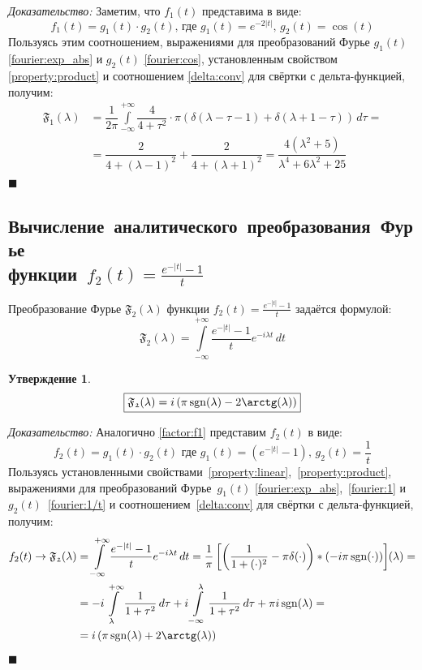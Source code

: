 \documentclass[11pt, oneside, draft]{article}
\numberwithin{equation}{section}
\newtheorem*{statement}{Утверждение}
\renewenvironment{proof}{\noindent\textit{Доказательство: }} {\qed}
\newcommand \rarrow{\rightarrow}
\newcommand \intinf[1][{\,dt}]{ \int\limits_{-\infty}^{+\infty}{{#1}}}
\renewcommand \qed{$\blacksquare$}
\DeclareMathOperator{\sgn}{sgn}
\begin{document}
	\begin{proof}
	Заметим, что \(f_1(t) \) представима в виде: 
	\begin{equation}\label{factor:f1}
	f_1(t) = g_1(t) \cdot g_2(t) \text{, где }g_1(t) = e^{-2|t|},\,g_2(t) = \cos(t)
	\end{equation}
	Пользуясь этим соотношением, выражениями для преобразований Фурье \(g_1(t)\) \eqref{fourier:exp_abs} и \(g_2(t)\) \eqref{fourier:cos}, установленным свойством \ref{property:product}
	 и соотношением \eqref{delta:conv} для свёртки с дельта-функцией, получим: 
	 \[
	 \begin{split}
		 \mathfrak{F_1} (\lambda) &= \dfrac{1}{2\pi} \intinf[{\dfrac{4}{4 + \tau^2} \cdot \pi(\delta(\lambda - \tau- 1) + \delta(\lambda + 1 - \tau))\,d\tau}] = \\
		 &=\dfrac{2}{4 + (\lambda - 1)^2} + \dfrac{2}{4 + (\lambda + 1)^2} 
		= \dfrac{4(\lambda^2 + 5)}{\lambda^4 + 6\lambda^2 + 25}
	\end{split}
	\]
	\end{proof}
	
\subsection{Вычисление~аналитического~преобразования~Фурье\\функции~\(f_2(t) = \frac{e^{-|t|} - 1}{t} \)}
Преобразование Фурье \( \mathfrak{F_2} (\lambda)\) функции \(f_2(t) = \frac{e^{-|t|} - 1}{t} \) задаётся формулой:
	\[
		\mathfrak{F_2} (\lambda) = \intinf[{\dfrac{e^{-|t|} - 1}{t} e^{-i\lambda t}\, dt}]
	\]

	\begin{statement}
	\begin{equation}\label{fourier_transform:f2}
	\boxed{
		\mathfrak{F_2}(\lambda) =  i\left(\pi\sgn(\lambda) - 2\arctg(\lambda)\right)
	}
	\end{equation}
	\end{statement}
	\begin{proof}
	Аналогично \eqref{factor:f1} представим \(f_2(t) \) в виде: 
	\begin{equation}\label{factor:f2}
	f_2(t) = g_1(t) \cdot g_2(t) \text{ где } g_1(t) = \left(e^{-|t|} - 1\right)\text{, }g_2(t) = \dfrac{1}{t}
	\end{equation}
	Пользуясь установленными свойствами~\ref{property:linear},~\ref{property:product}, выражениями для преобразований Фурье~\(g_1(t)\) \eqref{fourier:exp_abs},~\eqref{fourier:1} и~\(g_2(t)\)~\eqref{fourier:1/t}
	и соотношением~\eqref{delta:conv} для свёртки с дельта-функцией, получим: 
	\[
	\begin{split}
		f_2(t) \rarrow \mathfrak{F_2} (\lambda) &= \intinf[{ \dfrac{e^{-|t|} - 1}{t} e^{-i\lambda t}\, dt}] = \dfrac{1}{\pi}\left[\left({\dfrac{1}{1 + (\cdot)^2} - \pi\delta(\cdot)}\right) * \left({-i \pi \sgn(\cdot)}\right)\right]
		\negmedspace({\lambda}) = \\ 
		&= -i\int\limits_{\lambda}^{+\infty}{\dfrac{1}{1 + \tau^2}\, d\tau} + i\int\limits_{-\infty}^{\lambda}{\dfrac{1}{1 + \tau^2}\, d\tau} + \pi i \sgn(\lambda) = \\
		&= i\left(\pi \sgn(\lambda) + 2\arctg(\lambda)\right)
	\end{split}
	\]
	\end{proof}
\end{document}
